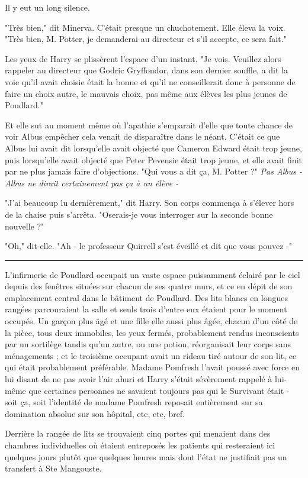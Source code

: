 Il y eut un long silence.

"Très bien," dit Minerva. C'était presque un chuchotement. Elle éleva la voix. "Très bien, M. Potter, je demanderai au directeur et s'il accepte, ce sera fait."

Les yeux de Harry se plissèrent l'espace d'un instant. "Je vois. Veuillez alors rappeler au directeur que Godric Gryffondor, dans son dernier souffle, a dit la voie qu'il avait choisie était la bonne et qu'il ne conseillerait donc à personne de faire un choix autre, le mauvais choix, pas même aux élèves les plus jeunes de Poudlard."

Et elle sut au moment même où l'apathie s'emparait d'elle que toute chance de voir Albus empêcher cela venait de disparaître dans le néant. C'était ce que Albus lui avait dit lorsqu'elle avait objecté que Cameron Edward était trop jeune, puis lorsqu'elle avait objecté que Peter Pevensie était trop jeune, et elle avait finit par ne plus jamais faire d'objections. "Qui vous a dit ça, M. Potter ?" \emph{Pas Albus - Albus ne dirait certainement pas ça à un élève -} 

"J'ai beaucoup lu dernièrement," dit Harry. Son corps commença à s'élever hors de la chaise puis s'arrêta. "Oserais-je vous interroger sur la seconde bonne nouvelle ?"

"Oh," dit-elle. "Ah - le professeur Quirrell s'est éveillé et dit que vous pouvez -"
\par\noindent\rule{\textwidth}{0.4pt}
L'infirmerie de Poudlard occupait un vaste espace puissamment éclairé par le ciel depuis des fenêtres situées sur chacun de ses quatre murs, et ce en dépit de son emplacement central dans le bâtiment de Poudlard. Des lits blancs en longues rangées parcouraient la salle et seuls trois d'entre eux étaient pour le moment occupés. Un garçon plus âgé et une fille elle aussi plus âgée, chacun d'un côté de la pièce, tous deux immobiles, les yeux fermés, probablement rendus inconscients par un sortilège tandis qu'un autre, ou une potion, réorganisait leur corps sans ménagements ; et le troisième occupant avait un rideau tiré autour de son lit, ce qui était probablement préférable. Madame Pomfresh l'avait poussé avec force en lui disant de ne pas avoir l'air ahuri et Harry s'était sévèrement rappelé à lui-même que certaines personnes ne savaient toujours pas qui le Survivant était - soit ça, soit l'identité de madame Pomfresh reposait entièrement sur sa domination absolue sur son hôpital, etc, etc, bref.

Derrière la rangée de lits se trouvaient cinq portes qui menaient dans des chambres individuelles où étaient entreposés les patients qui resteraient ici quelques jours plutôt que quelques heures mais dont l'état ne justifiait pas un transfert à Ste Mangouste.

